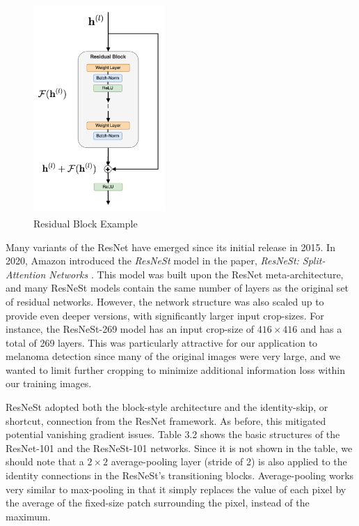 \documentclass [MAS] {uclathes}
\begin{document}
\begin{figure}[h]
\centering
\includegraphics[height = 80mm, width= 50mm]{imgs/resblock.png}
\caption{Residual Block Example}
\label{fig:res_block}
\end{figure}

Many variants of the ResNet have emerged since its initial release in 2015. In 2020, Amazon introduced the \textit{ResNeSt} model in the paper, \textit{ResNeSt: Split-Attention Networks} \cite{resnest}. This model was built upon the ResNet meta-architecture, and many ResNeSt models contain the same number of layers as the original set of residual networks. However, the network structure was also scaled up to provide even deeper versions, with significantly larger input crop-sizes. For instance, the ResNeSt-269 model has an input crop-size of $416 \times 416$ and has a total of 269 layers. This was particularly attractive for our application to melanoma detection since many of the original images were very large, and we wanted to limit further cropping to minimize additional information loss within our training images.

ResNeSt adopted both the block-style architecture and the identity-skip, or shortcut, connection from the ResNet framework. As before, this mitigated potential vanishing gradient issues. Table 3.2 shows the basic structures of the ResNet-101 and the ResNeSt-101 networks. Since it is not shown in the table, we should note that a $2 \times 2$ average-pooling layer (stride of 2) is also applied to the identity connections in the ResNeSt's transitioning blocks. Average-pooling works very similar to max-pooling in that it simply replaces the value of each pixel by the average of the fixed-size patch surrounding the pixel, instead of the maximum. 
\end{document}
